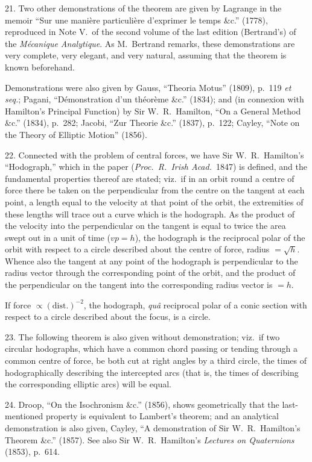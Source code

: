 \documentclass[11pt]{article}
\begin{document}
21. Two other demonstrations of the theorem are given by Lagrange in the memoir ``Sur une mani\`ere particuli\`ere d'exprimer le temps \&c.'' (1778), reproduced in Note V.\ of the second volume of the last edition (Bertrand's) of the \emph{M\'ecanique Analytique}. As M.\ Bertrand remarks, these demonstrations are very complete, very elegant, and very natural, assuming that the theorem is known beforehand.

Demonstrations were also given by Gauss, ``Theoria Motus'' (1809), p.\ 119 \emph{et seq.}; Pagani, ``D\'emonstration d'un th\'eor\`eme \&c.'' (1834); and (in connexion with Hamilton's Principal Function) by Sir W.\ R.\ Hamilton, ``On a General Method \&c.'' (1834), p.\ 282; Jacobi, ``Zur Theorie \&c.'' (1837), p.\ 122; Cayley, ``Note on the Theory of Elliptic Motion'' (1856).

22. Connected with the problem of central forces, we have Sir W.\ R.\ Hamilton's ``Hodograph,'' which in the paper (\emph{Proc.\ R.\ Irish Acad.}\ 1847) is defined, and the fundamental properties thereof are stated; viz.\ if in an orbit round a centre of force there be taken on the perpendicular from the centre on the tangent at each point, a length equal to the velocity at that point of the orbit, the extremities of these lengths will trace out a curve which is the hodograph. As the product of the velocity into the perpendicular on the tangent is equal to twice the area swept out in a unit of time ($vp=h$), the hodograph is the reciprocal polar of the orbit with respect to a circle described about the centre of force, radius $=\sqrt{h}$. Whence also the tangent at any point of the hodograph is perpendicular to the radius vector through the corresponding point of the orbit, and the product of the perpendicular on the tangent into the corresponding radius vector is $=h$.

If force $\propto(\text{dist.})^{-2}$, the hodograph, \emph{qu\^a} reciprocal polar of a conic section with respect to a circle described about the focus, is a circle.

23. The following theorem is also given without demonstration; viz.\ if two circular hodographs, which have a common chord passing or tending through a common centre of force, be both cut at right angles by a third circle, the times of hodographically describing the intercepted arcs (that is, the times of describing the corresponding elliptic arcs) will be equal.

24. Droop, ``On the Isochronism \&c.'' (1856), shows geometrically that the last-mentioned property is equivalent to Lambert's theorem; and an analytical demonstration is also given, Cayley, ``A demonstration of Sir W.\ R.\ Hamilton's Theorem \&c.'' (1857). See also Sir W.\ R.\ Hamilton's \emph{Lectures on Quaternions} (1853), p.\ 614.
\end{document}
